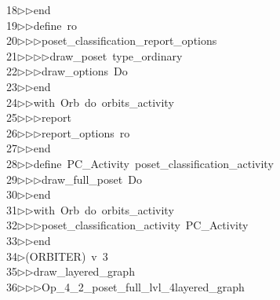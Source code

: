 \begin{tabbing}
18\>$\triangleright$\>$\triangleright$\>end\ \\[0pt]
19\>$\triangleright$\>$\triangleright$\>define\ ro\ \\[0pt]
20\>$\triangleright$\>$\triangleright$\>$\triangleright$\>poset\_classification\_report\_options\ \\[0pt]
21\>$\triangleright$\>$\triangleright$\>$\triangleright$\>$\triangleright$\>draw\_poset\ type\_ordinary\ \\[0pt]
22\>$\triangleright$\>$\triangleright$\>$\triangleright$\>draw\_options\ Do\ \\[0pt]
23\>$\triangleright$\>$\triangleright$\>end\ \\[0pt]
24\>$\triangleright$\>$\triangleright$\>with\ Orb\ do\ orbits\_activity\ \\[0pt]
25\>$\triangleright$\>$\triangleright$\>$\triangleright$\>report\ \ \\[0pt]
26\>$\triangleright$\>$\triangleright$\>$\triangleright$\>report\_options\ ro\ \\[0pt]
27\>$\triangleright$\>$\triangleright$\>end\ \\[0pt]
28\>$\triangleright$\>$\triangleright$\>define\ PC\_Activity\ poset\_classification\_activity\ \\[0pt]
29\>$\triangleright$\>$\triangleright$\>$\triangleright$\>draw\_full\_poset\ Do\ \\[0pt]
30\>$\triangleright$\>$\triangleright$\>end\ \\[0pt]
31\>$\triangleright$\>$\triangleright$\>with\ Orb\ do\ orbits\_activity\ \\[0pt]
32\>$\triangleright$\>$\triangleright$\>$\triangleright$\>poset\_classification\_activity\ PC\_Activity\ \\[0pt]
33\>$\triangleright$\>$\triangleright$\>end\\[0pt]
34\>$\triangleright$\>(ORBITER)\ v\ 3\ \\[0pt]
35\>$\triangleright$\>$\triangleright$\>draw\_layered\_graph\ \\[0pt]
36\>$\triangleright$\>$\triangleright$\>$\triangleright$\>Op\_4\_2\_poset\_full\_lvl\_4layered\_graph\ \\[0pt]

\end{tabbing}
